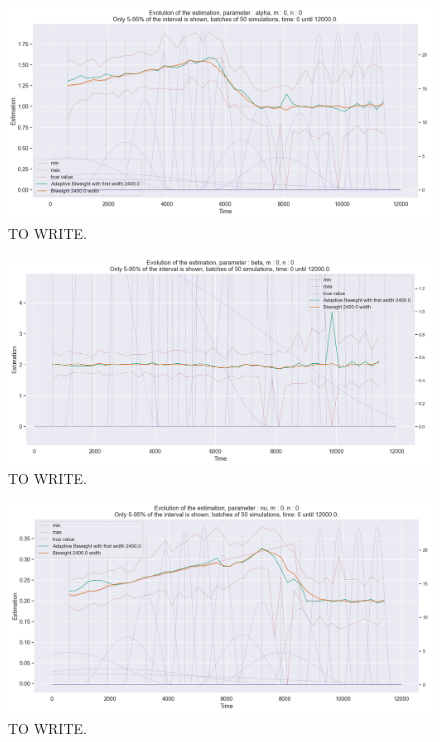 \begin{figure}
\centering
\includegraphics[width = 0.90 \textwidth]{../imag/chap3/3_bis/P.png}
\caption{TO WRITE.}
\label{fig:second_estimate_3_alpha}
\end{figure}

\begin{figure}
\centering
\includegraphics[width = 0.90 \textwidth]{../imag/chap3/3_bis/Q.png}
\caption{TO WRITE.}
\label{fig:second_estimate_3_beta}
\end{figure}

\begin{figure}
\centering
\includegraphics[width = 0.90 \textwidth]{../imag/chap3/3_bis/R.png}
\caption{TO WRITE.}
\label{fig:second_estimate_3_nu}
\end{figure}




